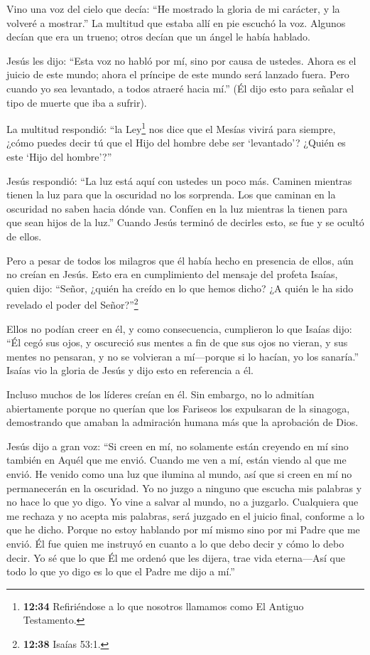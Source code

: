Vino una voz del cielo que decía: ``He mostrado la gloria de mi
carácter, y la volveré a mostrar.''  La multitud que estaba
allí en pie escuchó la voz. Algunos decían que era un trueno; otros
decían que un ángel le había hablado.

 Jesús les dijo: ``Esta voz no habló por mí, sino por causa
de ustedes.  Ahora es el juicio de este mundo; ahora el
príncipe de este mundo será lanzado fuera.  Pero cuando yo
sea levantado, a todos atraeré hacia mí.''  (Él dijo esto
para señalar el tipo de muerte que iba a sufrir).

 La multitud respondió: ``la Ley\footnote{\textbf{12:34}
  Refiriéndose a lo que nosotros llamamos como El Antiguo Testamento.}
nos dice que el Mesías vivirá para siempre, ¿cómo puedes decir tú que el
Hijo del hombre debe ser `levantado'? ¿Quién es este `Hijo del
hombre'?''

 Jesús respondió: ``La luz está aquí con ustedes un poco
más. Caminen mientras tienen la luz para que la oscuridad no los
sorprenda. Los que caminan en la oscuridad no saben hacia dónde van.
 Confíen en la luz mientras la tienen para que sean hijos
de la luz.'' Cuando Jesús terminó de decirles esto, se fue y se ocultó
de ellos.

 Pero a pesar de todos los milagros que él había hecho en
presencia de ellos, aún no creían en Jesús.  Esto era en
cumplimiento del mensaje del profeta Isaías, quien dijo: ``Señor, ¿quién
ha creído en lo que hemos dicho? ¿A quién le ha sido revelado el poder
del Señor?''\footnote{\textbf{12:38} Isaías 53:1.}

 Ellos no podían creer en él, y como consecuencia,
cumplieron lo que Isaías dijo:  ``Él cegó sus ojos, y
oscureció sus mentes a fin de que sus ojos no vieran, y sus mentes no
pensaran, y no se volvieran a mí---porque si lo hacían, yo los
sanaría.''  Isaías vio la gloria de Jesús y dijo esto en
referencia a él.

 Incluso muchos de los líderes creían en él. Sin embargo,
no lo admitían abiertamente porque no querían que los Fariseos los
expulsaran de la sinagoga,  demostrando que amaban la
admiración humana más que la aprobación de Dios.

 Jesús dijo a gran voz: ``Si creen en mí, no solamente
están creyendo en mí sino también en Aquél que me envió. 
Cuando me ven a mí, están viendo al que me envió.  He
venido como una luz que ilumina al mundo, así que si creen en mí no
permanecerán en la oscuridad.  Yo no juzgo a ninguno que
escucha mis palabras y no hace lo que yo digo. Yo vine a salvar al
mundo, no a juzgarlo.  Cualquiera que me rechaza y no
acepta mis palabras, será juzgado en el juicio final, conforme a lo que
he dicho.  Porque no estoy hablando por mí mismo sino por
mi Padre que me envió. Él fue quien me instruyó en cuanto a lo que debo
decir y cómo lo debo decir.  Yo sé que lo que Él me ordenó
que les dijera, trae vida eterna---Así que todo lo que yo digo es lo que
el Padre me dijo a mí.''

